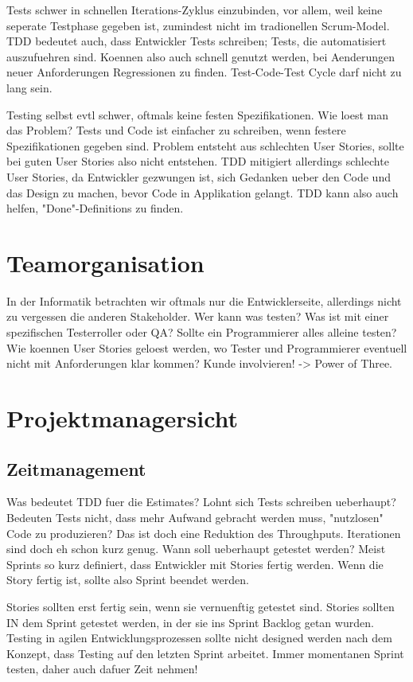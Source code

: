\documentclass[12pt,DIV14,BCOR10mm,a4paper,twoside,parskip=half-,headsepline,headinclude,english,ngerman,bibliography=totocnumbered]{scrreprt}
\begin{document}
Tests schwer in schnellen Iterations-Zyklus einzubinden, vor allem, weil keine seperate Testphase gegeben ist, zumindest nicht im tradionellen Scrum-Model.
TDD bedeutet auch, dass Entwickler Tests schreiben; Tests, die automatisiert auszufuehren sind.
Koennen also auch schnell genutzt werden, bei Aenderungen neuer Anforderungen Regressionen zu finden.
Test-Code-Test Cycle darf nicht zu lang sein.

Testing selbst evtl schwer, oftmals keine festen Spezifikationen.
Wie loest man das Problem?
Tests und Code ist einfacher zu schreiben, wenn festere Spezifikationen gegeben sind.
Problem entsteht aus schlechten User Stories, sollte bei guten User Stories also nicht entstehen.
TDD mitigiert allerdings schlechte User Stories, da Entwickler gezwungen ist, sich Gedanken ueber den Code und das Design zu machen, bevor Code in Applikation gelangt.
TDD kann also auch helfen, "Done"-Definitions zu finden.

\section{Teamorganisation}

In der Informatik betrachten wir oftmals nur die Entwicklerseite, allerdings nicht zu vergessen die anderen Stakeholder.
Wer kann was testen?
Was ist mit einer spezifischen Testerroller oder QA?
Sollte ein Programmierer alles alleine testen?
Wie koennen User Stories geloest werden, wo Tester und Programmierer eventuell nicht mit Anforderungen klar kommen?
Kunde involvieren! -> Power of Three.

\section{Projektmanagersicht}
\subsection{Zeitmanagement}

Was bedeutet TDD fuer die Estimates?
Lohnt sich Tests schreiben ueberhaupt?
Bedeuten Tests nicht, dass mehr Aufwand gebracht werden muss, "nutzlosen" Code zu produzieren?
Das ist doch eine Reduktion des Throughputs.
Iterationen sind doch eh schon kurz genug.
Wann soll ueberhaupt getestet werden?
Meist Sprints so kurz definiert, dass Entwickler mit Stories fertig werden.
Wenn die Story fertig ist, sollte also Sprint beendet werden.

Stories sollten erst fertig sein, wenn sie vernuenftig getestet sind.
Stories sollten IN dem Sprint getestet werden, in der sie ins Sprint Backlog getan wurden.
Testing in agilen Entwicklungsprozessen sollte nicht designed werden nach dem Konzept, dass Testing auf den letzten Sprint arbeitet.
Immer momentanen Sprint testen, daher auch dafuer Zeit nehmen!
\end{document}
